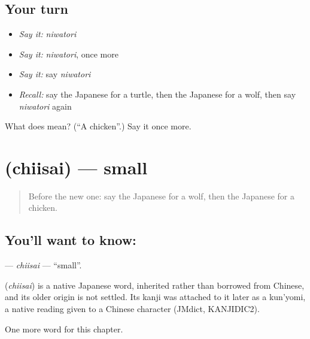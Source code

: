 \subsection*{Your turn}
\begin{itemize}
\raggedright
  \item \emph{Say it:} \emph{niwatori}
  \item \emph{Say it:} \emph{niwatori}, once more
  \item \emph{Say it:} say \emph{niwatori}
  \item \emph{Recall:} say the Japanese for a turtle, then the Japanese for a wolf, then say \emph{niwatori} again
\end{itemize}

\begin{tcolorbox}[breakable,colback=teal!4,colframe=teal!35!black,title={Before you move on}]
What does  mean? (\textquotedblleft{}A chicken\textquotedblright{}.) Say it once more.
\end{tcolorbox}
\section[\texorpdfstring{\ja{ちいさい} (chiisai)}{ちいさい (chiisai)}]{ (chiisai) — small}

\label{lesson:JA-C48-chiisai}



\begin{quote}
Before the new one: say the Japanese for a wolf, then the Japanese for a chicken.
\end{quote}

\subsection*{You'll want to know: }
\textbf{} — \emph{chiisai} — \textquotedblleft{}small\textquotedblright{}.

\begin{cousinweb}
\textbf{} (\emph{chiisai}) is a native Japanese word, inherited rather than borrowed from Chinese, and its older origin is not settled. Its kanji was attached to it later as a kun'yomi, a native reading given to a Chinese character (JMdict, KANJIDIC2).
\end{cousinweb}

\begin{grammarlens}[title={What you've built}]
One more word for this chapter.
\end{grammarlens}

